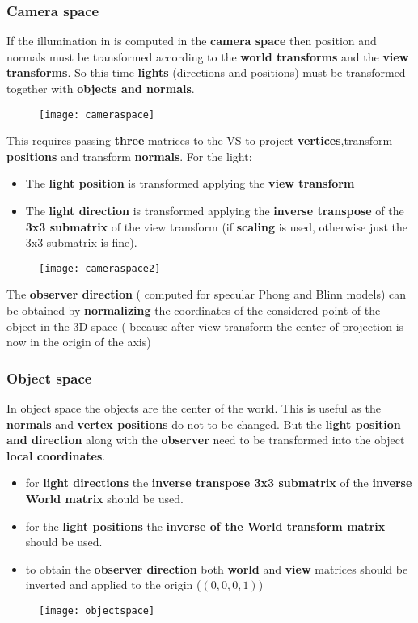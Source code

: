 \subsubsection{Camera space}
If the illumination in is computed in the \textbf{camera space} then position and normals must be transformed according to the \textbf{world transforms} and the \textbf{view transforms}. So this time \textbf{lights} (directions and positions)  must be transformed together with \textbf{objects and normals}.
\begin{figure}[H]
 \centering
 \texttt{[image: cameraspace]} 
\end{figure} 
This requires passing \textbf{three} matrices to the VS to project \textbf{vertices},transform \textbf{positions} and transform \textbf{normals}.
For the light:
\begin{itemize}
\item The \textbf{light position} is transformed applying the \textbf{view transform}
\item The \textbf{light direction} is transformed applying the \textbf{inverse transpose} of the \textbf{3x3 submatrix} of the view transform (if \textbf{scaling} is used, otherwise just the 3x3 submatrix is fine).
\end{itemize} 
\begin{figure}[H]
 \centering
 \texttt{[image: cameraspace2]} 
\end{figure} 
The \textbf{observer direction} ( computed for specular Phong and Blinn models) can be obtained by \textbf{normalizing} the coordinates of the considered point of the object in the 3D space ( because after view transform the center of projection is now in the origin of the axis)

\subsubsection{Object space}
In object space the objects are the center of the world. This is useful as the \textbf{normals } and \textbf{vertex positions} do not to be changed. But the \textbf{light position and direction} along with the \textbf{observer} need to be transformed into the object \textbf{local coordinates}.
\begin{itemize}
\item for \textbf{light directions} the \textbf{inverse transpose 3x3 submatrix} of the \textbf{inverse World matrix} should be used.
\item for the \textbf{light positions} the \textbf{inverse of the World transform matrix} should be used.
\item to obtain the \textbf{observer direction} both \textbf{world} and \textbf{view} matrices should be inverted and applied to the origin ($(0,0,0,1)$) 
\end{itemize}
\begin{figure}[H]
 \centering
 \texttt{[image: objectspace]} 
\end{figure} 

